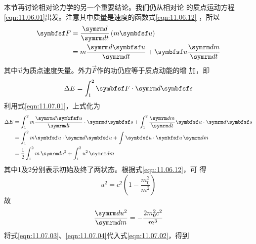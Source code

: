 \section[质能关系]{}\label{sec:11.07}

本节再讨论相对论力学的另一个重要结论。我们仍从相对论
的质点运动方程\eqref{eqn:11.06.01}出发。注意其中质量是速度的函数式\lhbrak \eqref{eqn:11.06.12} \rhbrak ，所以
\begin{equation}\label{eqn:11.07.01}
  \begin{split}
    \vec{F} &= \frac { \dif } { \dif t } \left( m \vec{u} \right) \\
    &= m \frac { \dif \vec{u} } { \dif t } + \vec{u} \frac { \dif m } { \dif t }
  \end{split}
\end{equation}
其中$ \vec{u} $为质点速度矢量。外力$\vec{F}$作的功仍应等于质点动能的增
加，即
\begin{equation*}
  \Delta E = \int _ 1 ^ 2 \vec{F} \cdot \dif \vec{s}
\end{equation*}
利用式\eqref{eqn:11.07.01}，上式化为
\begin{equation}\label{eqn:11.07.02}
  \begin{aligned}
    \Delta E & =\int_{1}^{2} m \frac{ \dif \vec{u}}{ \dif t} \cdot \dif \vec{s}+\int_{1}^{2} \frac{ \dif m}{ \dif t} \vec{u } \cdot \dif \vec{s} \\
             & =\int_{1}^{2} m \vec{u} \cdot \dif \vec{u}+\int \vec{u} \cdot \vec{u} \dif m                                                      \\
             & =\frac{1}{2} \int_{1}^{2} m \dif u^{2}+\int_{1}^{2} u^{2} \dif m
  \end{aligned}
\end{equation}
其中1及2分别表示初始及终了两状态。根据式\eqref{eqn:11.06.12}，可
得
\begin{equation}\label{eqn:11.07.03}
  u ^ { 2 } = c ^ { 2 } \left( 1 - \frac { m _ { 0 } ^ { 2 } } { m ^ { 2 } } \right)
\end{equation}
故
\begin{equation}\label{eqn:11.07.04}
  \frac{ \dif u^{2}}{ \dif m}=-\frac{2 m_{0}^{2} c^{2}}{m^{3}}
\end{equation}
将式\eqref{eqn:11.07.03}、\eqref{eqn:11.07.04}代入式\eqref{eqn:11.07.02}，得到

